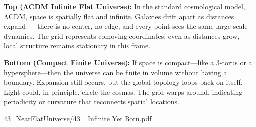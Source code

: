 \begin{SideNotePage}{
  \textbf{Top (ΛCDM Infinite Flat Universe):}  
  In the standard cosmological model, ΛCDM, space is spatially flat and infinite. Galaxies drift apart as distances expand — there is no center, no edge, and every point sees the same large-scale dynamics. The grid represents comoving coordinates: even as distances grow, local structure remains stationary in this frame. \par

  \textbf{Bottom (Compact Finite Universe):}  
  If space is compact—like a 3-torus or a hypersphere—then the universe can be finite in volume without having a boundary. Expansion still occurs, but the global topology loops back on itself. Light could, in principle, circle the cosmos. The grid warps around, indicating periodicity or curvature that reconnects spatial locations. \par
}{43_NearFlatUniverse/43_ Infinite Yet Born.pdf}
\end{SideNotePage}
